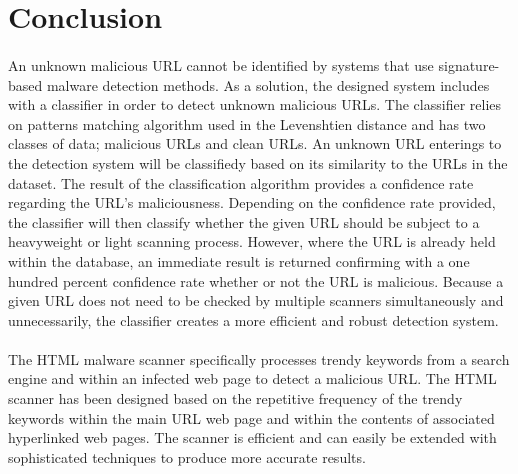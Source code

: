 \section{Conclusion}

\paragraph{} 
An unknown malicious URL cannot be identified by systems that use signature-based malware detection methods. As a solution, the designed system includes with a classifier in order to detect unknown malicious URLs. The classifier relies on patterns matching algorithm used in the Levenshtien distance and has two classes of data; malicious URLs and clean URLs. An unknown URL enterings to the detection system will be classifiedy based on its similarity to the URLs in the dataset. The result of the classification algorithm provides a confidence rate regarding the URL’s maliciousness. Depending on the confidence rate provided, the classifier will then classify whether the given URL should be subject to a heavyweight or light scanning process. However, where the URL is already held within the database, an immediate result is returned confirming with a one hundred percent confidence rate whether or not the URL is malicious. Because a given URL does not need to be checked by multiple scanners simultaneously and unnecessarily, the classifier creates a more efficient and robust detection system. 
 
\paragraph{}   
The HTML malware scanner specifically processes trendy keywords from a search engine and within an infected web page to detect a malicious URL. The HTML scanner has been designed based on the repetitive frequency of the trendy keywords within the main URL web page and within the contents of associated hyperlinked web pages. The scanner is efficient and can easily be extended with sophisticated techniques to produce more accurate results. 
